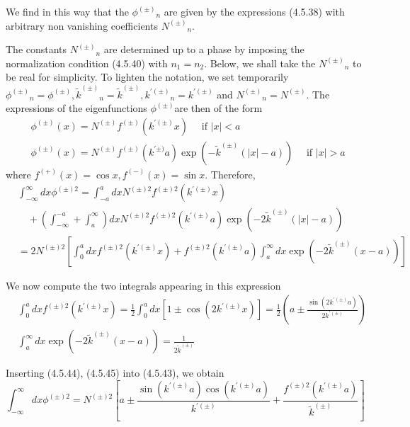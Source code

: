 \documentclass{article}
\begin{document}
We find in this way that the $\phi^{( \pm)}{ }_{n}$ are given by the expressions (4.5.38) with arbitrary non vanishing coefficients $N^{( \pm)}{ }_{n}$.

The constants $N^{( \pm)}{ }_{n}$ are determined up to a phase by imposing the normalization condition (4.5.40) with $n_{1}=n_{2}$. Below, we shall take the $N^{( \pm)}{ }_{n}$ to be real for simplicity. To lighten the notation, we set temporarily $\phi^{( \pm)}{ }_{n}=\phi^{( \pm)}, \tilde{k}^{( \pm)}{ }_{n}=\tilde{k}^{( \pm)}, k^{\prime( \pm)}{ }_{n}=k^{\prime( \pm)}$ and $N^{( \pm)}{ }_{n}=N^{( \pm)}$. The expressions of the eigenfunctions $\phi^{( \pm)}$are then of the form
$$
\begin{align*}
& \phi^{( \pm)}(x)=N^{( \pm)} f^{( \pm)}\left(k^{\prime( \pm)} x\right) \quad \text { if }|x|<a  \tag{4.5.42a}\\
& \phi^{( \pm)}(x)=N^{( \pm)} f^{( \pm)}\left(k^{\prime \pm)} a\right) \exp \left(-\tilde{k}^{( \pm)}(|x|-a)\right) \quad \text { if }|x|>a \tag{4.5.42b}
\end{align*}
$$
where $f^{(+)}(x)=\cos x, f^{(-)}(x)=\sin x$. Therefore,
$$
\begin{align*}
& \int_{-\infty}^{\infty} d x \phi^{( \pm) 2}=\int_{-a}^{a} d x N^{( \pm) 2} f^{( \pm) 2}\left(k^{\prime( \pm)} x\right)  \tag{4.5.43}\\
& \quad+\left(\int_{-\infty}^{-a}+\int_{a}^{\infty}\right) d x N^{( \pm) 2} f^{( \pm) 2}\left(k^{\prime( \pm)} a\right) \exp \left(-2 \tilde{k}^{( \pm)}(|x|-a)\right) \\
& =2 N^{( \pm) 2}\left[\int_{0}^{a} d x f^{( \pm) 2}\left(k^{\prime( \pm)} x\right)+f^{( \pm) 2}\left(k^{\prime( \pm)} a\right) \int_{a}^{\infty} d x \exp \left(-2 \tilde{k}^{( \pm)}(x-a)\right)\right]
\end{align*}
$$

We now compute the two integrals appearing in this expression
$$
\begin{align*}
& \int_{0}^{a} d x f^{( \pm) 2}\left(k^{\prime( \pm)} x\right)=\frac{1}{2} \int_{0}^{a} d x\left[1 \pm \cos \left(2 k^{\prime( \pm)} x\right)\right]=\frac{1}{2}\left(a \pm \frac{\sin \left(2 k^{\prime( \pm)} a\right)}{2 k^{\prime( \pm)}}\right)  \tag{4.5.44}\\
& \int_{a}^{\infty} d x \exp \left(-2 \tilde{k}^{( \pm)}(x-a)\right)=\frac{1}{2 \tilde{k}^{( \pm)}} \tag{4.5.45}
\end{align*}
$$

Inserting (4.5.44), (4.5.45) into (4.5.43), we obtain
$$
\begin{equation*}
\int_{-\infty}^{\infty} d x \phi^{( \pm) 2}=N^{( \pm) 2}\left[a \pm \frac{\sin \left(k^{\prime( \pm)} a\right) \cos \left(k^{\prime( \pm)} a\right)}{k^{\prime( \pm)}}+\frac{f^{( \pm) 2}\left(k^{\prime( \pm)} a\right)}{\tilde{k}^{( \pm)}}\right] \tag{4.5.46}
\end{equation*}
$$
\end{document}
